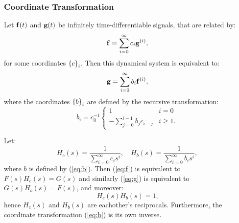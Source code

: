 \subsubsection{Coordinate Transformation}

\begin{theorem}
Let $\mathbf{f}(t)$ and $\mathbf{g}(t)$ be infinitely time-differentiable signals, that are related by:
\begin{equation} \label{eq:f}
\mathbf{f} = \sum_{i=0}^\infty c_i \mathbf{g}^{(i)} \text{,}
\end{equation}
for some coordinates $\left\{ c \right\}_{i}$. Then this dynamical system is equivalent to:
\begin{equation} \label{eq:g}
\mathbf{g} = \sum_{i=0}^\infty b_i \mathbf{f}^{(i)} \text{,}
\end{equation}
where the coordinates $\left\{ b \right\}_{i}$ are defined by the recursive transformation:
\begin{equation} \label{eq:b}
b_i = c_0^{-1} \begin{cases}
    1 & i = 0 \\
    - \sum_{j=0}^{i-1} b_j c_{i - j} & i \ge 1 \text{.}
  \end{cases}
\end{equation}
\end{theorem}

\begin{corollary}
Let: $$H_c(s) = \frac{1}{\sum_{i=0}^\infty c_i s^i}, \quad H_b(s) = \frac{1}{\sum_{i=0}^\infty b_i s^i}, $$ where $b$ is defined by (\ref{eq:b}). Then (\ref{eq:f}) is equivalent to $F(s)H_c(s) = G(s)$ and similarly (\ref{eq:g}) is equivalent to $G(s)H_b(s) = F(s)$, and moreover:
\begin{equation} \label{eq:inv}
H_c(s) H_b(s) = 1 \text{,}
\end{equation}
hence $H_c(s)$ and $H_b(s)$ are eachother's reciprocals. Furthermore, the coordinate transformation (\ref{eq:b}) is its own inverse.
\end{corollary}

